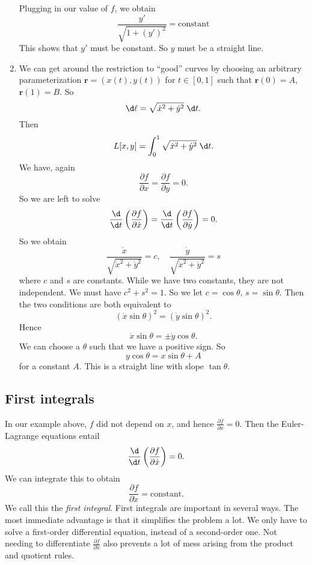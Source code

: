\documentclass[a4paper]{article}
\begin{document}
\begin{eg}
\begin{enumerate}
      Plugging in our value of $f$, we obtain
      \[
        \frac{y'}{\sqrt{1 + (y')^2}} = \text{constant}
      \]
      This shows that $y'$ must be constant. So $y$ must be a straight line.
    \item We can get around the restriction to ``good'' curves by choosing an arbitrary parameterization $\mathbf{r} = (x(t), y(t))$ for $t\in [0, 1]$ such that $\mathbf{r}(0) = A$, $\mathbf{r}(1) = B$. So
      \[
        \d \ell = \sqrt{\dot x^2 + \dot y^2}\;\d t.
      \]
      Then
      \[
        L[x, y] = \int_0^1 \sqrt{\dot x^2 + \dot y^2} \;\d t.
      \]
      We have, again
      \[
        \frac{\partial f}{\partial x} = \frac{\partial f}{\partial y} = 0.
      \]
      So we are left to solve
      \[
        \frac{\d }{\d t}\left(\frac{\partial f}{\partial \dot x}\right) = \frac{\d }{\d t}\left(\frac{\partial f}{\partial \dot y}\right) = 0.
      \]
      So we obtain
      \[
        \frac{\dot x}{\sqrt{\dot x^2 + \dot y^2}} = c,\quad \frac{\dot y}{\sqrt{\dot x^2 + \dot y^2}} = s
      \]
      where $c$ and $s$ are constants. While we have two constants, they are not independent. We must have $c^2 + s^2 = 1$. So we let $c = \cos \theta$, $s = \sin \theta$. Then the two conditions are both equivalent to
      \[
        (\dot x \sin \theta)^2 = (\dot y\sin \theta)^2.
      \]
      Hence
      \[
        \dot x \sin \theta = \pm\dot y \cos \theta.
      \]
      We can choose a $\theta$ such that we have a positive sign. So
      \[
        y\cos \theta = x\sin \theta + A
      \]
      for a constant $A$. This is a straight line with slope $\tan \theta$.
  \end{enumerate}
\end{eg}
\subsection{First integrals}
In our example above, $f$ did not depend on $x$, and hence $\frac{\partial f}{\partial x} = 0$. Then the Euler-Lagrange equations entail
\[
  \frac{\d}{\d t}\left(\frac{\partial f}{\partial \dot{x}}\right) = 0.
\]
We can integrate this to obtain
\[
  \frac{\partial f}{\partial \dot{x}} = \text{constant}.
\]
We call this the \emph{first integral}. First integrals are important in several ways. The most immediate advantage is that it simplifies the problem a lot. We only have to solve a first-order differential equation, instead of a second-order one. Not needing to differentiate $\frac{\partial f}{\partial \dot{x}}$ also prevents a lot of mess arising from the product and quotient rules.
\end{document}
